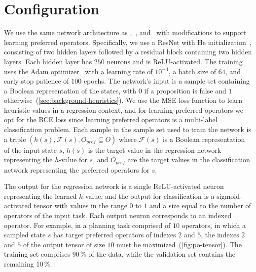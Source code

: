 \documentclass[ppgc,diss,english]{iiufrgs}
\begin{document}
\section{Configuration}
\label{sec:exp-configuration}
We use the same network architecture as \citet{Ferber.etal/2022},~\citet{OToole/2022}, and~\citet{Bettker.etal/2022} with modifications to support learning preferred operators. Specifically, we use a ResNet with He initialization~\cite{He.etal/2015}, consisting of two hidden layers followed by a residual block containing two hidden layers.
Each hidden layer has $250$ neurons and is ReLU-activated.
The training uses the Adam optimizer~\cite{Kingma.Ba/2015} with a learning rate of $10^{-4}$, a batch size of $64$, and early stop patience of $100$ epochs.
The network's input is a sample set containing a Boolean representation of the states, with $0$ if a proposition is false and $1$ otherwise~(\cref{sec:background-heuristics}).
We use the MSE loss function to learn heuristic values in a regression context, and for learning preferred operators we opt for the BCE loss since learning preferred operators is a multi-label classification problem.
Each sample in the sample set used to train the network is a triple $(h(s), \mathcal{F}(s), O_{pref} \subseteq O)$
where $\mathcal{F}(s)$ is a Boolean representation of the input state $s$, $h(s)$ is the target value in the regression network representing the $h$-value for $s$, and $O_{pref}$ are the target values in the classification network representing the preferred operators for $s$.

The output for the regression network is a single ReLU-activated neuron representing the learned $h$-value, and the output for classification is a sigmoid-activated tensor with values in the range $0$ to $1$ and a size equal to the number of operators of the input task.
Each output neuron corresponds to an indexed operator. For example, in a planning task comprised of $10$ operators, in which a sampled state $s$ has target preferred operators of indexes $2$ and $5$, the indexes $2$ and $5$ of the output tensor of size $10$ must be maximized~(\cref{fig:po-tensor}). The training set comprises $90\,\%$ of the data, while the validation set contains the remaining $10\,\%$.
\end{document}
